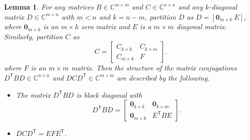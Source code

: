\documentclass[12pt]{article}
\newcommand{\trans}[1]{{#1}^\mathsf{T}}	%
\newcommand{\zeroVec}{\bm{0}}	%
\newtheorem{lemma}{Lemma}[section]
\begin{document}
\begin{lemma}
\label{lem:k-diagonal}
For any matrices $B \in \mathbb{C}^{m \times m}$ and $C \in \mathbb{C}^{n \times n}$ and any $k$-diagonal matrix $D \in \mathbb{C}^{m \times n}$ with $m < n$ and $k = n-m$, partition $D$ as $D = [\zeroVec_{m \times k} ~ E]$, where $\zeroVec_{m \times k}$ is an $m \times k$ zero matrix and $E$ is a $m \times m$ diagonal matrix. Similarly, partition $C$ as
\[C = \begin{bmatrix}
C_{k \times k} & C_{k \times m} \\
C_{m \times k} & F
\end{bmatrix}.\]
where $F$ is an $m \times m$ matrix. Then the structure of the matrix conjugations $\trans{D}BD \in \mathbb{C}^{n \times n}$ and $DC\trans{D} \in \mathbb{C}^{m \times m}$ are described by the following.
\begin{itemize}
\item[(a)] The matrix $\trans{D}BD$ is block diagonal with
\[\trans{D}BD = \begin{bmatrix}
\zeroVec_{k \times k} & \zeroVec_{k \times m} \\
\zeroVec_{m \times k} & \trans{E}BE
\end{bmatrix}.\]
\item[(b)] $DC\trans{D} = EF\trans{E}$.
\end{itemize}
\end{lemma}
\end{document}
